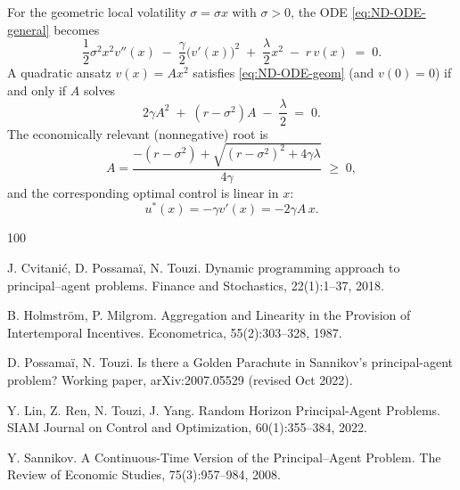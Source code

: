 \documentclass[a4paper,10pt]{article}
\theoremstyle{definition}
\theoremstyle{plain}
\numberwithin{equation}{section}
\newcommand{\hs}{\vspace{3mm}}
\begin{document}
\hs

For the geometric local volatility $\sigma=\sigma x$ with $\sigma>0$, the ODE \eqref{eq:ND-ODE-general} becomes
\begin{equation}
\label{eq:ND-ODE-geom}
\frac{1}{2}\sigma^2 x^2 v''(x)
\;-\;
\frac{\gamma}{2}\big(v'(x)\big)^2
\;+\;
\frac{\lambda}{2}x^2
\;-\;
r\,v(x)
\;=\;0.
\end{equation}
A quadratic ansatz $v(x)=A x^2$ satisfies \eqref{eq:ND-ODE-geom} (and $v(0)=0$) if and only if $A$ solves
\begin{equation}
\label{eq:ND-Riccati}
2\gamma A^2 \;+\; (r-\sigma^2)A \;-\; \frac{\lambda}{2} \;=\;0.
\end{equation}
The economically relevant (nonnegative) root is
\begin{equation}
\label{eq:ND-A}
A
=
\frac{-(r-\sigma^2)+\sqrt{(r-\sigma^2)^2+4\gamma\lambda}}{4\gamma}
\;\ge\;0,
\end{equation}
and the corresponding optimal control is linear in $x$:
\begin{equation}
\label{eq:ND-u-star-explicit}
u^*(x)= -\gamma v'(x)= -2\gamma A\,x.
\end{equation}

\begin{thebibliography}{100}

J. Cvitani\'c, D. Possama\"i, N. Touzi. Dynamic programming approach to principal--agent problems.
{Finance and Stochastics}, 22(1):1--37, 2018.

B. Holmstr\"om, P. Milgrom. Aggregation and Linearity in the Provision of Intertemporal Incentives.
{Econometrica}, 55(2):303--328, 1987.

D. Possama\"i, N. Touzi. Is there a Golden Parachute in Sannikov's principal-agent problem?
Working paper, arXiv:2007.05529 (revised Oct 2022).

Y. Lin, Z. Ren, N. Touzi, J. Yang. Random Horizon Principal-Agent Problems.
{SIAM Journal on Control and Optimization}, 60(1):355--384, 2022.

Y. Sannikov. A Continuous-Time Version of the Principal--Agent Problem.
{The Review of Economic Studies}, 75(3):957--984, 2008.

\end{thebibliography}
\end{document}
